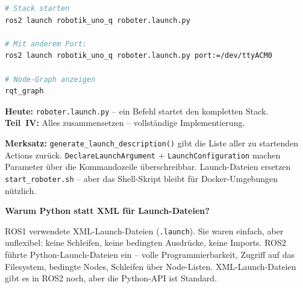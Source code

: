 \begin{lstlisting}[language=bash]
# Stack starten
ros2 launch robotik_uno_q roboter.launch.py

# Mit anderem Port:
ros2 launch robotik_uno_q roboter.launch.py port:=/dev/ttyACM0

# Node-Graph anzeigen
rqt_graph
\end{lstlisting}

\begin{projektBox}
\textbf{Heute:} \texttt{roboter.launch.py} -- ein Befehl startet den kompletten Stack.\\
\textbf{Teil~IV:} Alles zusammensetzen -- vollständige Implementierung.
\end{projektBox}

\begin{merksatzBox}
\textbf{Merksatz:}
\texttt{generate\_launch\_description()} gibt die Liste aller zu startenden Actions zurück.
\texttt{DeclareLaunchArgument} + \texttt{LaunchConfiguration} machen Parameter
über die Kommandozeile überschreibbar.
Launch-Dateien ersetzen \texttt{start\_roboter.sh} -- aber das Shell-Skript
bleibt für Docker-Umgebungen nützlich.
\end{merksatzBox}

\begin{haubeBox}
\textbf{Warum Python statt XML für Launch-Dateien?}

ROS1 verwendete XML-Launch-Dateien (\texttt{.launch}).
Sie waren einfach, aber unflexibel: keine Schleifen,
keine bedingten Ausdrücke, keine Imports.
ROS2 führte Python-Launch-Dateien ein -- volle Programmierbarkeit,
Zugriff auf das Filesystem, bedingte Nodes, Schleifen über Node-Listen.
XML-Launch-Dateien gibt es in ROS2 noch, aber die Python-API ist Standard.
\end{haubeBox}
